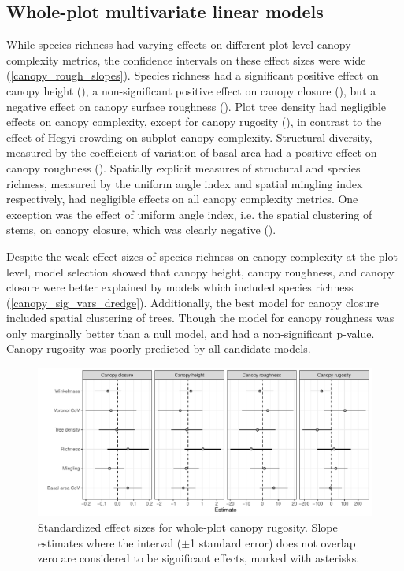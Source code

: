 \documentclass[11pt,a4paper]{article}
\begin{document}


\subsection{Whole-plot multivariate linear models}

While species richness had varying effects on different plot level canopy complexity metrics, the confidence intervals on these effect sizes were wide (\autoref{canopy_rough_slopes}). Species richness had a significant positive effect on canopy height (\richHeightP{}), a non-significant positive effect on canopy closure (\richCoverP{}), but a negative effect on canopy surface roughness (\richRoughP{}). Plot tree density had negligible effects on canopy complexity, except for canopy rugosity (\treeDensRugP{}), in contrast to the effect of Hegyi crowding on subplot canopy complexity. Structural diversity, measured by the coefficient of variation of basal area had a positive effect on canopy roughness (\covBARoughP{}). Spatially explicit measures of structural and species richness, measured by the uniform angle index and spatial mingling index respectively, had negligible effects on all canopy complexity metrics. One exception was the effect of uniform angle index, i.e. the spatial clustering of stems, on canopy closure, which was clearly negative (\wiCoverP{}). 

Despite the weak effect sizes of species richness on canopy complexity at the plot level, model selection showed that canopy height, canopy roughness, and canopy closure were better explained by models which included species richness (\autoref{canopy_sig_vars_dredge}). Additionally, the best model for canopy closure included spatial clustering of trees. Though the model for canopy roughness was only marginally better than a null model, and had a non-significant p-value. Canopy rugosity was poorly predicted by all candidate models.

\begin{figure}
	\includegraphics[width=\linewidth]{canopy_rough_slopes}
	\caption{Standardized effect sizes for whole-plot canopy rugosity. Slope estimates where the interval ($\pm$1 standard error) does not overlap zero are considered to be significant effects, marked with asterisks.}
	\label{canopy_rough_slopes}
\end{figure}
\end{document}
